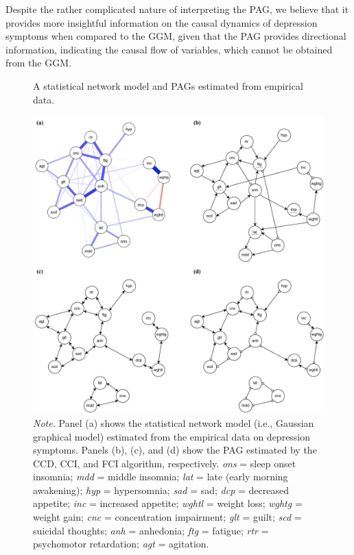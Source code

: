 \documentclass[twoside, 11pt]{article}
\begin{document}
Despite the rather complicated nature of interpreting the PAG, we believe that it provides more insightful information on the causal dynamics of depression symptoms when compared to the GGM, given that the PAG provides directional information, indicating the causal flow of variables, which cannot be obtained from the GGM. 


\begin{figure}[!htbp]
    \centering
        \caption{A statistical network model and PAGs estimated from empirical data.}
        \vspace{1mm}
        \includegraphics[width=1\textwidth]{figures/Fig19.pdf}
        \vspace*{1mm}
        \caption*{\small{\textit{Note.} Panel (a) shows the statistical network model (i.e., Gaussian graphical model) estimated from the empirical data on depression symptoms. Panels (b), (c), and (d) show the PAG estimated by the CCD, CCI, and FCI algorithm, respectively. \textit{ons} = sleep onset insomnia; \textit{mdd} = middle insomnia; \textit{lat} = late (early morning awakening); \textit{hyp} = hypersomnia; \textit{sad} = sad; \textit{dcp} = decreased appetite; \textit{inc} = increased appetite; \textit{wghtl} = weight loss; \textit{wghtg} = weight gain; \textit{cnc} = concentration impairment; \textit{glt} = guilt; \textit{scd} = suicidal thoughts; \textit{anh} = anhedonia; \textit{ftg} = fatigue; \textit{rtr} = psychomotor retardation; \textit{agt} = agitation.}}
    \label{fig:20}
\end{figure}
\end{document}
